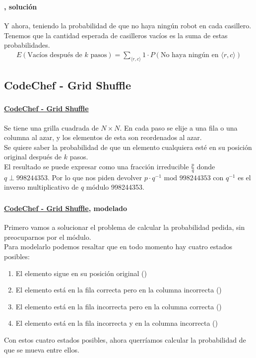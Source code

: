 \documentclass[../main.tex]{subfiles}
\begin{document}
\begin{frame}
  \frametitle{\SECTIOND}
  \framesubtitle{\EJD, solución}

  Y ahora, teniendo la probabilidad de que no haya ningún robot en cada casillero. Tenemos que la cantidad esperada de casilleros vacíos es la suma de estas probabilidades. \pause 
  \begin{gather*}
    E(\text{Vacíos después de \(k\) pasos}) = \sum_{\langle r, c \rangle}1 \cdot P(\text{No haya ningún en } \langle r, c \rangle)
  \end{gather*}
\end{frame}

\newcommand{\EJE}{\href{https://www.codechef.com/ICPCIN19/problems/SHUFGRID}{CodeChef - Grid Shuffle}}
\subsection{CodeChef - Grid Shuffle}

\begin{frame}
  \frametitle{\SECTIOND}
  \framesubtitle{\EJE}

  Se tiene una grilla cuadrada de \(N \times N\). En cada paso se elije a una fila o una columna al azar, y los elementos de esta son reordenados al azar. \\
  Se quiere saber la probabilidad de que un elemento cualquiera esté en su posición original después de \(k\) pasos. \pause \\
  El resultado se puede expresar como una fracción irreducible \(\frac{p}{q}\) donde \(q \perp 998244353\). Por lo que nos piden devolver \(p \cdot q^{-1} \text{ mod } 998244353\) con \(q^{-1}\) es el inverso multiplicativo de \(q\) módulo 998244353.
\end{frame}

\begin{frame}
  \frametitle{\SECTIOND}
  \framesubtitle{\EJE, modelado}

  Primero vamos a solucionar el problema de calcular la probabilidad pedida, sin preocuparnos por el módulo. \pause \\
  Para modelarlo podemos resaltar que en todo momento hay cuatro estados posibles:
  \begin{enumerate}
    \item<2-> El elemento sigue en su posición original (\Grrcc)
    \item<3-> El elemento está en la fila correcta pero en la columna incorrecta (\Grrcm)
    \item<4-> El elemento está en la fila incorrecta pero en la columna correcta (\Grmcc)
    \item<5-> El elemento está en la fila incorrecta y en la columna incorrecta (\Grmcm)
  \end{enumerate}
  \pause \pause \pause \pause Con estos cuatro estados posibles, ahora querríamos calcular la probabilidad de que se mueva entre ellos.
\end{frame}
\end{document}
